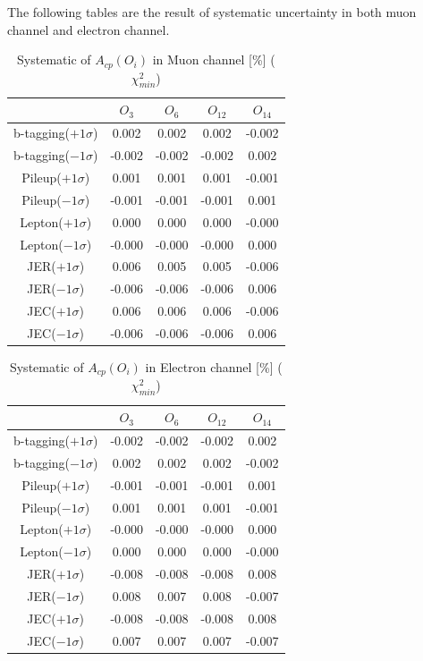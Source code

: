 		The following tables are the result of systematic uncertainty in both muon channel and electron channel.

		\begin{center}
		\setlength{\tabcolsep}{12pt}
		\begin{longtable}{ | c | c c c c | }
		\caption{Systematic of $A_{cp}(O_i)$ in Muon channel [\%] ($\chi^2_{min}$)}\\
		\hline
		 [\%] & $O_3$ & $O_6$ & $O_{12}$ & $O_{14}$ \\
		\hline
		b-tagging($+1\sigma$) & 0.002 & 0.002 & 0.002 & -0.002 \\
		b-tagging($-1\sigma$) & -0.002 & -0.002 & -0.002 & 0.002 \\
		\hline
		Pileup($+1\sigma$) & 0.001 & 0.001 & 0.001 & -0.001 \\
		Pileup($-1\sigma$) & -0.001 & -0.001 & -0.001 & 0.001 \\
		\hline
		Lepton($+1\sigma$) & 0.000 & 0.000 & 0.000 & -0.000 \\
		Lepton($-1\sigma$) & -0.000 & -0.000 & -0.000 & 0.000 \\
		\hline
		JER($+1\sigma$) & 0.006 & 0.005 & 0.005 & -0.006 \\
		JER($-1\sigma$) & -0.006 & -0.006 & -0.006 & 0.006 \\
		\hline
		JEC($+1\sigma$) & 0.006 & 0.006 & 0.006 & -0.006 \\
		JEC($-1\sigma$) & -0.006 & -0.006 & -0.006 & 0.006 \\
		\hline
		\end{longtable}
		\end{center}

		\begin{center}
		\setlength{\tabcolsep}{12pt}
		\begin{longtable}{ | c | c c c c | }
		\caption{Systematic of $A_{cp}(O_i)$ in Electron channel [\%] ($\chi^2_{min}$)}\\
		\hline
		 [\%] & $O_3$ & $O_6$ & $O_{12}$ & $O_{14}$ \\
		\hline
		b-tagging($+1\sigma$) & -0.002 & -0.002 & -0.002 & 0.002 \\
		b-tagging($-1\sigma$) & 0.002 & 0.002 & 0.002 & -0.002 \\
		\hline
		Pileup($+1\sigma$) & -0.001 & -0.001 & -0.001 & 0.001 \\
		Pileup($-1\sigma$) & 0.001 & 0.001 & 0.001 & -0.001 \\
		\hline
		Lepton($+1\sigma$) & -0.000 & -0.000 & -0.000 & 0.000 \\
		Lepton($-1\sigma$) & 0.000 & 0.000 & 0.000 & -0.000 \\
		\hline
		JER($+1\sigma$) & -0.008 & -0.008 & -0.008 & 0.008 \\
		JER($-1\sigma$) & 0.008 & 0.007 & 0.008 & -0.007 \\
		\hline
		JEC($+1\sigma$) & -0.008 & -0.008 & -0.008 & 0.008 \\
		JEC($-1\sigma$) & 0.007 & 0.007 & 0.007 & -0.007 \\
		\hline
		\end{longtable}
		\end{center}

